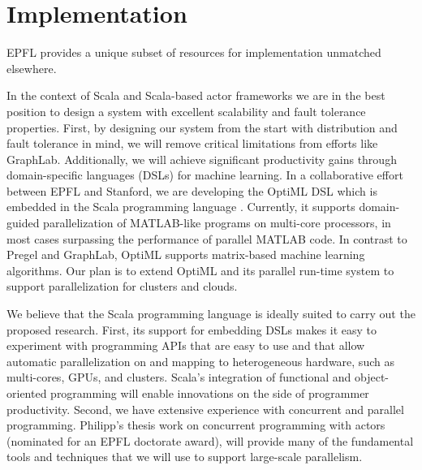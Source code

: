 \documentclass[acmtocl]{acmtrans2m}
\begin{document}
\section{Implementation}
EPFL provides a unique subset of resources for implementation unmatched elsewhere.

In the context of Scala and Scala-based actor frameworks \cite{HallerO09,Akka} we are in the best position to design a system with excellent scalability and fault tolerance properties. First, by designing our system from the start with distribution and fault tolerance in mind, we will remove critical limitations from efforts like GraphLab. Additionally, we will achieve significant productivity gains through domain-specific languages (DSLs) \cite{ChafiDMRSHOO10} for machine learning. In a collaborative effort between EPFL and Stanford, we are developing the OptiML DSL \cite{Chafi11} which is embedded in the Scala programming language \cite{Odersky-Spoon-Venners08}. Currently, it supports domain-guided parallelization of MATLAB-like programs on multi-core processors, in most cases surpassing the performance of parallel MATLAB code. In contrast to Pregel and GraphLab, OptiML supports matrix-based machine learning algorithms. Our plan is to extend OptiML and its parallel run-time system to support parallelization for clusters and clouds.

We believe that the Scala programming language is ideally suited to carry out the proposed research. First, its support for embedding DSLs \cite{ChafiDMRSHOO10} makes it easy to experiment with programming APIs that are easy to use and that allow automatic parallelization on and mapping to heterogeneous hardware, such as multi-cores, GPUs, and clusters. Scala's integration of functional and object-oriented programming will enable innovations on the side of programmer productivity. Second, we have extensive experience with concurrent and parallel programming. Philipp's thesis work on concurrent programming with actors \cite{HallerThesis} (nominated for an EPFL doctorate award), will provide many of the fundamental tools and techniques that we will use to support large-scale parallelism.


\end{document}
